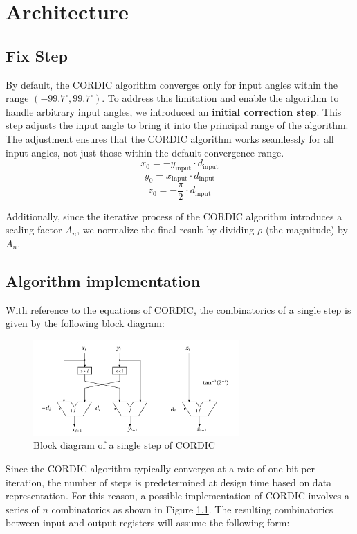 \chapter{Architecture}
\section{Fix Step}
By default, the CORDIC algorithm converges only for input angles within the range \( (-99.7^\circ, 99.7^\circ) \).
To address this limitation and enable the algorithm to handle arbitrary input angles, we introduced an \textbf{initial correction step}. This step adjusts the input angle to bring it into the principal range of the algorithm. The adjustment ensures that the CORDIC algorithm works seamlessly for all input angles, not just those within the default convergence range.
\[
    x_0 = -y_{\text{input}} \cdot d_{\text{input}}
\]
\[
    y_0 =  x_{\text{input}} \cdot d_{\text{input}}
\]
\[
    z_0 = -\frac{\pi}{2} \cdot d_{\text{input}}
\]

Additionally, since the iterative process of the CORDIC algorithm introduces a scaling factor \( A_n \), we normalize the final result by dividing \( \rho \) (the magnitude) by \( A_n \).

\section{Algorithm implementation}
With reference to the equations of CORDIC, the combinatorics of a single step is given by the following block diagram:

\begin{figure}[H]
    \centering
    \includegraphics[width=0.7\textwidth]{images/Architecture/basic_CORDIC.pdf}
    \caption{Block diagram of a single step of CORDIC}
    \label{fig:basic_CORDIC}
\end{figure}

Since the CORDIC algorithm typically converges at a rate of one bit per iteration, the number of steps is predetermined at design time based on data representation. For this reason, a possible implementation of CORDIC involves a series of \( n \) combinatorics as shown in Figure \ref{fig:basic_CORDIC}. The resulting combinatorics between input and output registers will assume the following form:


